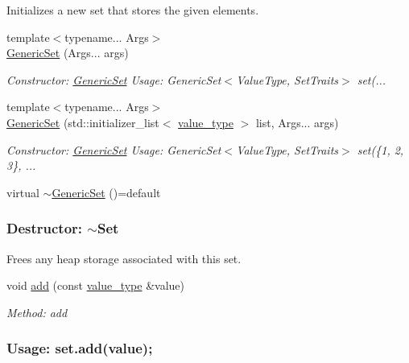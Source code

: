 \begin{DoxyCompactItemize}
\begin{DoxyCompactList}
Initializes a new set that stores the given elements. \end{DoxyCompactList}\item 
{\footnotesize template$<$typename... Args$>$ }\\\mbox{\hyperlink{classstanfordcpplib_1_1collections_1_1GenericSet_abcd375e42dcb08298b04d3425d2b95d7}{Generic\+Set}} (Args... args)
\begin{DoxyCompactList}\small\item\em Constructor\+: \mbox{\hyperlink{classstanfordcpplib_1_1collections_1_1GenericSet}{Generic\+Set}} Usage\+: Generic\+Set$<$\+Value\+Type, Set\+Traits$>$ set(... \end{DoxyCompactList}\item 
{\footnotesize template$<$typename... Args$>$ }\\\mbox{\hyperlink{classstanfordcpplib_1_1collections_1_1GenericSet_aae5f987c2f3dc9708bed63dd9c80b5fa}{Generic\+Set}} (std\+::initializer\+\_\+list$<$ \mbox{\hyperlink{classstanfordcpplib_1_1collections_1_1GenericSet_a669c81f158766925e7293f97c0099b28}{value\+\_\+type}} $>$ list, Args... args)
\begin{DoxyCompactList}\small\item\em Constructor\+: \mbox{\hyperlink{classstanfordcpplib_1_1collections_1_1GenericSet}{Generic\+Set}} Usage\+: Generic\+Set$<$\+Value\+Type, Set\+Traits$>$ set(\{1, 2, 3\}, ... \end{DoxyCompactList}\item 
virtual \mbox{\hyperlink{classstanfordcpplib_1_1collections_1_1GenericSet_ab221b36dcc150632e4f355130d16f377}{$\sim$\+Generic\+Set}} ()=default
\begin{DoxyCompactList}\small\item\em \subsubsection*{Destructor\+: $\sim$\+Set }

Frees any heap storage associated with this set. \end{DoxyCompactList}\item 
void \mbox{\hyperlink{classstanfordcpplib_1_1collections_1_1GenericSet_a7cfcf4823a6ebadb0244d0943e5ea727}{add}} (const \mbox{\hyperlink{classstanfordcpplib_1_1collections_1_1GenericSet_a669c81f158766925e7293f97c0099b28}{value\+\_\+type}} \&value)
\begin{DoxyCompactList}\small\item\em Method\+: add \subsubsection*{Usage\+: set.\+add(value); }


\end{DoxyCompactList}
\end{DoxyCompactItemize}
